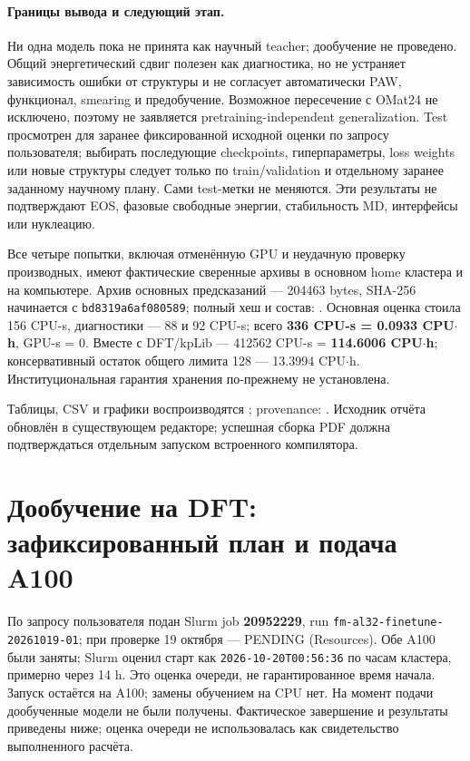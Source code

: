 \documentclass[11pt,a4paper]{article}
\begin{document}
\paragraph{Границы вывода и следующий этап.}
Ни одна модель пока не принята как научный teacher; дообучение не проведено.
Общий энергетический сдвиг полезен как диагностика, но не устраняет
зависимость ошибки от структуры и не согласует автоматически PAW,
функционал, smearing и предобучение. Возможное пересечение с OMat24
не исключено, поэтому не заявляется pretraining-independent generalization.
Test просмотрен для заранее фиксированной исходной оценки по запросу
пользователя; выбирать последующие checkpoints, гиперпараметры,
loss weights или новые структуры следует только по train/validation
и отдельному заранее заданному научному плану. Сами test-метки не меняются.
Эти результаты не подтверждают EOS, фазовые свободные энергии,
стабильность MD, интерфейсы или нуклеацию.

Все четыре попытки, включая отменённую GPU и неудачную проверку
производных, имеют фактические сверенные архивы в основном home
кластера и  на компьютере.
Архив основных предсказаний --- 204463 bytes, SHA-256 начинается с
\texttt{bd8319a6af080589}; полный хеш и состав:
.
Основная оценка стоила 156 CPU-s, диагностики --- 88 и 92 CPU-s;
всего \textbf{336 CPU-s = 0.0933 CPU$\cdot$h}, GPU-s = 0.
Вместе с DFT/kpLib --- 412562 CPU-s = \textbf{114.6006 CPU$\cdot$h};
консервативный остаток общего лимита 128 --- 13.3994 CPU$\cdot$h.
Институциональная гарантия хранения по-прежнему не установлена.

Таблицы, CSV и графики воспроизводятся
; provenance:
.
Исходник отчёта обновлён в существующем редакторе; успешная сборка PDF
должна подтверждаться отдельным запуском встроенного компилятора.

\section{Дообучение на DFT: зафиксированный план и подача A100}
\label{sec:finetune-plan}
По запросу пользователя подан Slurm job \textbf{20952229},
run \texttt{fm-al32-finetune-20261019-01}; при проверке 19 октября ---
PENDING (Resources). Обе A100 были заняты; Slurm оценил старт как
\texttt{2026-10-20T00:56:36} по часам кластера, примерно через 14 h.
Это оценка очереди, не гарантированное время начала.
Запуск остаётся на A100; замены обучением на CPU нет.
На момент подачи дообученные модели не были получены.
Фактическое завершение и результаты приведены ниже; оценка очереди
не использовалась как свидетельство выполненного расчёта.
\end{document}
